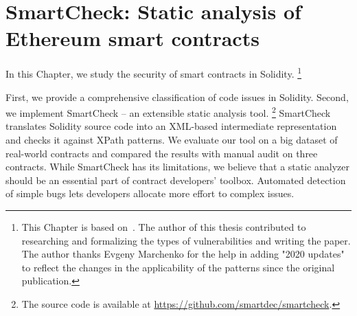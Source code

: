 \chapter{SmartCheck: Static analysis of Ethereum smart contracts}

\label{Chapter11SmartCheck}



In this Chapter, we study the security of smart contracts in Solidity.
\footnote{This Chapter is based on~\cite{Tikhomirov2018}. The author of this thesis contributed to researching and formalizing the types of vulnerabilities and writing the paper. The author thanks Evgeny Marchenko for the help in adding "2020 updates" to reflect the changes in the applicability of the patterns since the original publication.}

First, we provide a comprehensive classification of code issues in Solidity.
Second, we implement SmartCheck -- an extensible static analysis tool.
\footnote{The source code is available at \url{https://github.com/smartdec/smartcheck}.}
SmartCheck translates Solidity source code into an XML-based intermediate representation and checks it against XPath patterns.
We evaluate our tool on a big dataset of real-world contracts and compared the results with manual audit on three contracts.
While SmartCheck has its limitations, we believe that a static analyzer should be an essential part of contract developers' toolbox.
Automated detection of simple bugs lets developers allocate more effort to complex issues.



%










